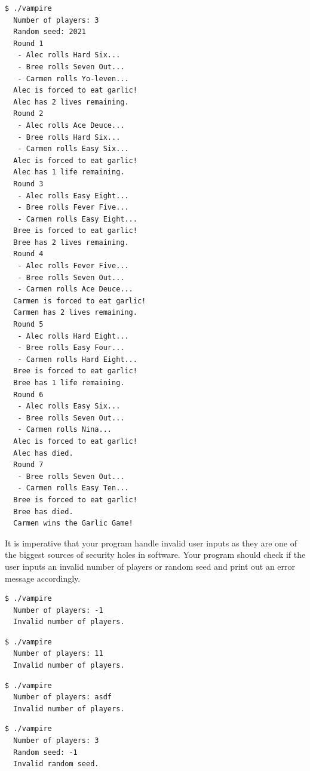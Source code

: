 \documentclass[11pt]{article}
\begin{document}
\begin{lstlisting}[style=bashstyle]
  $ ./vampire
  Number of players: 3
  Random seed: 2021
  Round 1
   - Alec rolls Hard Six...
   - Bree rolls Seven Out...
   - Carmen rolls Yo-leven...
  Alec is forced to eat garlic!
  Alec has 2 lives remaining.
  Round 2
   - Alec rolls Ace Deuce...
   - Bree rolls Hard Six...
   - Carmen rolls Easy Six...
  Alec is forced to eat garlic!
  Alec has 1 life remaining.
  Round 3
   - Alec rolls Easy Eight...
   - Bree rolls Fever Five...
   - Carmen rolls Easy Eight...
  Bree is forced to eat garlic!
  Bree has 2 lives remaining.
  Round 4
   - Alec rolls Fever Five...
   - Bree rolls Seven Out...
   - Carmen rolls Ace Deuce...
  Carmen is forced to eat garlic!
  Carmen has 2 lives remaining.
  Round 5
   - Alec rolls Hard Eight...
   - Bree rolls Easy Four...
   - Carmen rolls Hard Eight...
  Bree is forced to eat garlic!
  Bree has 1 life remaining.
  Round 6
   - Alec rolls Easy Six...
   - Bree rolls Seven Out...
   - Carmen rolls Nina...
  Alec is forced to eat garlic!
  Alec has died.
  Round 7
   - Bree rolls Seven Out...
   - Carmen rolls Easy Ten...
  Bree is forced to eat garlic!
  Bree has died.
  Carmen wins the Garlic Game!
\end{lstlisting}

It is imperative that your program handle invalid user inputs as they are one of
the biggest sources of security holes in software. Your program should check if
the user inputs an invalid number of players or random seed and print out an
error message accordingly.

\begin{lstlisting}[style=bashstyle]
  $ ./vampire
  Number of players: -1
  Invalid number of players.
\end{lstlisting}

\begin{lstlisting}[style=bashstyle]
  $ ./vampire
  Number of players: 11
  Invalid number of players.
\end{lstlisting}

\begin{lstlisting}[style=bashstyle]
  $ ./vampire
  Number of players: asdf
  Invalid number of players.
\end{lstlisting}

\begin{lstlisting}[style=bashstyle]
  $ ./vampire
  Number of players: 3
  Random seed: -1
  Invalid random seed.
\end{lstlisting}
\end{document}
